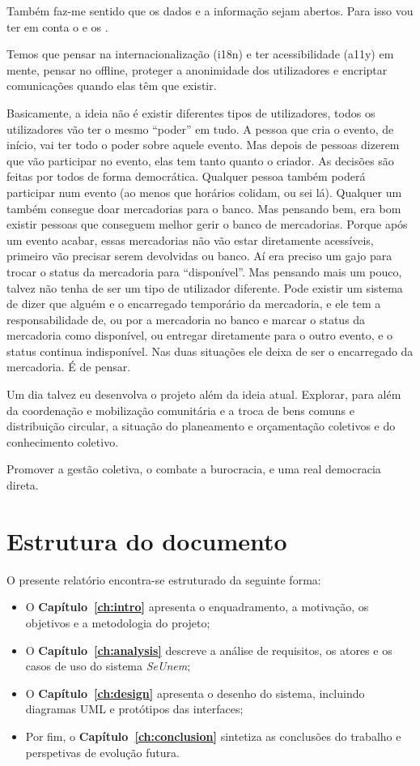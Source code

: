 \documentclass[12pt,a4paper,openright,oneside]{memoir}
\begin{document}
Também faz-me sentido que os dados e a informação sejam abertos. Para isso vou
ter em conta o \autocite{5stardata} e os \autocite{fair_principles}.

Temos que pensar na internacionalização (i18n) e ter acessibilidade (a11y) em
mente, pensar no offline, proteger a anonimidade dos utilizadores e encriptar
comunicações quando elas têm que existir.

Basicamente, a ideia não é existir diferentes tipos de utilizadores, todos os
utilizadores vão ter o mesmo “poder” em tudo. A pessoa que cria o evento, de
início, vai ter todo o poder sobre aquele evento. Mas depois de pessoas dizerem
que vão participar no evento, elas tem tanto quanto o criador. As decisões são
feitas por todos de forma democrática. Qualquer pessoa também poderá participar
num evento (ao menos que horários colidam, ou sei lá). Qualquer um também
consegue doar mercadorias para o banco. Mas pensando bem, era bom existir
pessoas que conseguem melhor gerir o banco de mercadorias. Porque após um
evento acabar, essas mercadorias não vão estar diretamente acessíveis, primeiro
vão precisar serem devolvidas ou banco. Aí era preciso um gajo para trocar o
status da mercadoria para “disponível”. Mas pensando mais um pouco, talvez não
tenha de ser um tipo de utilizador diferente. Pode existir um sistema de dizer
que alguém e o encarregado temporário da mercadoria, e ele tem a
responsabilidade de, ou por a mercadoria no banco e marcar o status da
mercadoria como disponível, ou entregar diretamente para o outro evento, e o
status continua indisponível. Nas duas situações ele deixa de ser o encarregado
da mercadoria. É de pensar.

Um dia talvez eu desenvolva o projeto além da ideia atual. Explorar, para além
da coordenação e mobilização comunitária e a troca de bens comuns e
distribuição circular, a situação do planeamento e orçamentação coletivos e do
conhecimento coletivo.

Promover a gestão coletiva, o combate a burocracia, e uma real democracia
direta.

\section*{Estrutura do documento}

O presente relatório encontra-se estruturado da seguinte forma:
\begin{itemize}
  \item O \textbf{Capítulo~\ref{ch:intro}} apresenta o enquadramento, a motivação, os objetivos e a metodologia do projeto;
  \item O \textbf{Capítulo~\ref{ch:analysis}} descreve a análise de requisitos, os atores e os casos de uso do sistema \textit{SeUnem};
  \item O \textbf{Capítulo~\ref{ch:design}} apresenta o desenho do sistema, incluindo diagramas UML e protótipos das interfaces;
  \item Por fim, o \textbf{Capítulo~\ref{ch:conclusion}} sintetiza as conclusões do trabalho e perspetivas de evolução futura.
\end{itemize}
\end{document}
